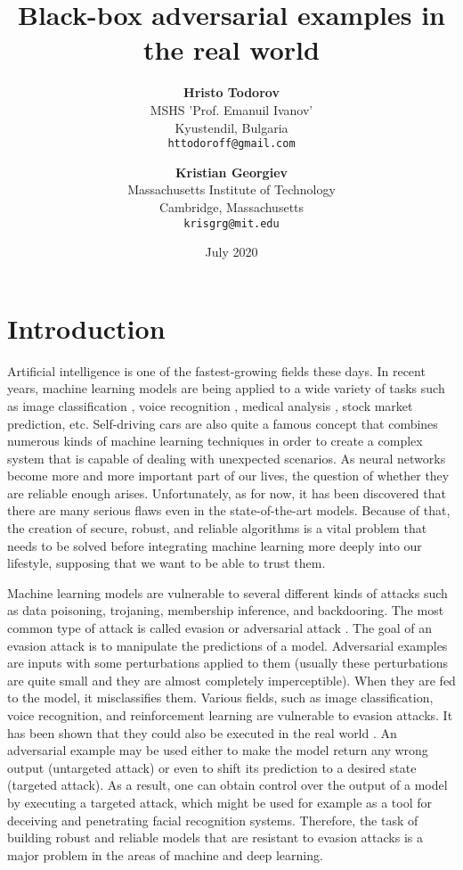 \documentclass{article}
\title{Black-box adversarial examples in the real world}
\author{
\textbf{Hristo Todorov} \\
MSHS 'Prof. Emanuil Ivanov' \\
Kyustendil, Bulgaria \\
\texttt{httodoroff@gmail.com}
\and
\textbf{Kristian Georgiev} \\
Massachusetts Institute of Technology \\
Cambridge, Massachusetts \\
\texttt{krisgrg@mit.edu}
}
\date{July 2020}
\begin{document}
\maketitle

\section{Introduction}
Artificial intelligence is one of the fastest-growing fields these days. In recent years, machine learning models are being applied to a wide variety of tasks such as image classification \cite{alexnet}, voice recognition \cite{chiu2017stateoftheart}, medical analysis \cite{medical}, stock market prediction, etc. Self-driving cars are also quite a famous concept that combines numerous kinds of machine learning techniques in order to create a complex system that is capable of dealing with unexpected scenarios. As neural networks become more and more important part of our lives, the question of whether they are reliable enough arises. Unfortunately, as for now, it has been discovered that there are many serious flaws even in the state-of-the-art models. Because of that, the creation of secure, robust, and reliable algorithms is a vital problem that needs to be solved before integrating machine learning more deeply into our lifestyle, supposing that we want to be able to trust them.

Machine learning models are vulnerable to several different kinds of attacks such as data poisoning, trojaning, membership inference, and backdooring. The most common type of attack is called evasion or adversarial attack \cite{goodfellow2014explaining}. The goal of an evasion attack is to manipulate the predictions of a model. Adversarial examples are inputs with some perturbations applied to them (usually these perturbations are quite small and they are almost completely imperceptible). When they are fed to the model, it misclassifies them. Various fields, such as image classification, voice recognition, and reinforcement learning are vulnerable to evasion attacks. It has been shown that they could also be executed in the real world \cite{kurakin2016adversarial, athalye2017synthesizing}. An adversarial example may be used either to make the model return any wrong output (untargeted attack) or even to shift its prediction to a desired state (targeted attack). As a result, one can obtain control over the output of a model by executing a targeted attack, which might be used for example as a tool for deceiving and penetrating facial recognition systems. Therefore, the task of building robust and reliable models that are resistant to evasion attacks is a major problem in the areas of machine and deep learning.
\end{document}
